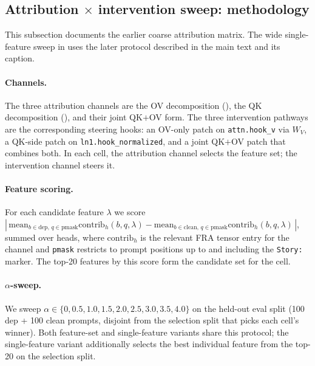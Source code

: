 \documentclass{article} %
\theoremstyle{plain}
\theoremstyle{definition}
\theoremstyle{remark}
\newcommand{\WV}{W_V}
\begin{document}
\subsection{Attribution $\times$ intervention sweep: methodology}
\label{app:sleeper_method}

This subsection documents the earlier coarse attribution matrix. The wide single-feature sweep in  uses the later protocol described in the main text and its caption.

\paragraph{Channels.} The three attribution channels are the OV decomposition (), the QK decomposition (), and their joint QK${+}$OV form. The three intervention pathways are the corresponding steering hooks: an OV-only patch on \texttt{attn.hook\_v} via $\WV$, a QK-side patch on \texttt{ln1.hook\_normalized}, and a joint QK${+}$OV patch that combines both. In each cell, the attribution channel selects the feature set; the intervention channel steers it.

\paragraph{Feature scoring.} For each candidate feature $\lambda$ we score $|\,\mathrm{mean}_{b \in \text{dep},\, q \in \text{pmask}} \mathrm{contrib}_h(b, q, \lambda) - \mathrm{mean}_{b \in \text{clean},\, q \in \text{pmask}} \mathrm{contrib}_h(b, q, \lambda)\,|$, summed over heads, where $\mathrm{contrib}_h$ is the relevant FRA tensor entry for the channel and \texttt{pmask} restricts to prompt positions up to and including the \texttt{Story:} marker. The top-20 features by this score form the candidate set for the cell.

\paragraph{$\alpha$-sweep.} We sweep $\alpha \in \{0, 0.5, 1.0, 1.5, 2.0, 2.5, 3.0, 3.5, 4.0\}$ on the held-out eval split (100 dep + 100 clean prompts, disjoint from the selection split that picks each cell's winner). Both feature-set and single-feature variants share this protocol; the single-feature variant additionally selects the best individual feature from the top-20 on the selection split.
\end{document}
